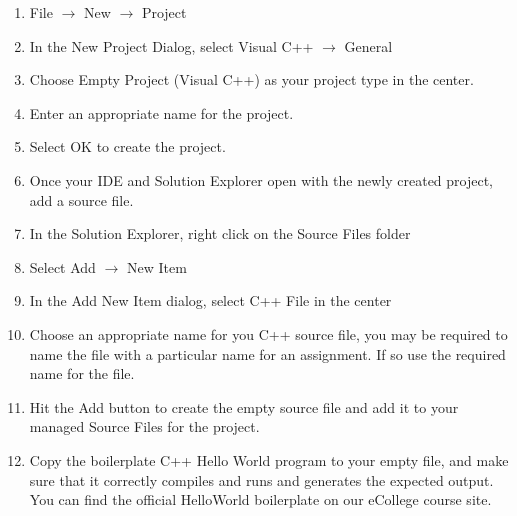 \documentclass[11pt]{article}
\begin{document}
\begin{enumerate}
\item File $\rightarrow$ New $\rightarrow$ Project
\item In the New Project Dialog, select Visual C++ $\rightarrow$ General
\item Choose Empty Project (Visual C++) as your project type in the center.
\item Enter an appropriate name for the project.
\item Select OK to create the project.
\item Once your IDE and Solution Explorer open with the newly created project, add a source file.
\item In the Solution Explorer, right click on the Source Files folder
\item Select Add $\rightarrow$ New Item
\item In the Add New Item dialog, select C++ File in the center
\item Choose an appropriate name for you C++ source file, you may be required to name the file with a particular name for an assignment.  If so use the required name for the file.
\item Hit the Add button to create the empty source file and add it to your managed Source Files for the project.
\item Copy the boilerplate C++ Hello World program to your empty file, and make sure that it correctly compiles and runs and generates the expected output.  You can find the official HelloWorld boilerplate on our eCollege course site.
\end{enumerate}
\end{document}
